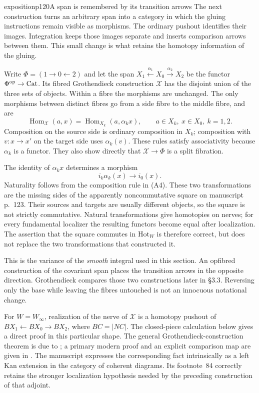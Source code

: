 \begin{dcomment}{exposition}{p120}{A span is remembered by its transition arrows}
The next construction turns an arbitrary span into a category in which the gluing instructions remain visible as morphisms.  The ordinary pushout identifies their images.  Integration keeps those images separate and inserts comparison arrows between them.  This small change is what retains the homotopy information of the gluing.

Write $\Phi=(1\to0\leftarrow2)$ and let the span $X_1\xleftarrow{\alpha_1}X_0\xrightarrow{\alpha_2}X_2$ be the functor $\Phi^{\mathrm{op}}\to\mathrm{Cat}$.  Its fibred Grothendieck construction $\mathcal X$ has the disjoint union of the three sets of objects.  Within a fibre the morphisms are unchanged.  The only morphisms between distinct fibres go from a side fibre to the middle fibre, and are
\[
 \operatorname{Hom}_{\mathcal X}(a,x)
     =\operatorname{Hom}_{X_k}(a,\alpha_kx),
 \qquad a\in X_k,\ x\in X_0,\ k=1,2.
 \tag{A4}
\]
Composition on the source side is ordinary composition in $X_k$; composition with $v:x\to x'$ on the target side uses $\alpha_k(v)$.  These rules satisfy associativity because $\alpha_k$ is a functor.  They also show directly that $\mathcal X\to\Phi$ is a split fibration.

The identity of $\alpha_kx$ determines a morphism
\[
 i_k\alpha_k(x)\longrightarrow i_0(x).
\]
Naturality follows from the composition rule in (A4).  These two transformations are the missing sides of the apparently noncommutative square on manuscript p.~123.  Their sources and targets are usually different objects, so the square is not strictly commutative.  Natural transformations give homotopies on nerves; for every fundamental localizer the resulting functors become equal after localization.  The assertion that the square commutes in $\mathrm{Hot}_W$ is therefore correct, but does not replace the two transformations that constructed it.

This is the variance of the \emph{smooth} integral used in this section.  An opfibred construction of the covariant span places the transition arrows in the opposite direction.  Grothendieck compares those two constructions later in \S3.3.  Reversing only the base while leaving the fibres untouched is not an innocuous notational change.

For $W=W_\infty$, realization of the nerve of $\mathcal X$ is a homotopy pushout of $BX_1\leftarrow BX_0\to BX_2$, where $BC=|NC|$.  The closed-piece calculation below gives a direct proof in this particular shape.  The general Grothendieck-construction theorem is due to \citet[Theorem~1.2]{Thomason1979}; a primary modern proof and an explicit comparison map are given in \citet[\S3, equation~(9) and Theorem~3]{Cegarra2020}.  The manuscript expresses the corresponding fact intrinsically as a left Kan extension in the category of coherent diagrams.  Its footnote~84 correctly retains the stronger localization hypothesis needed by the preceding construction of that adjoint.
\end{dcomment}


